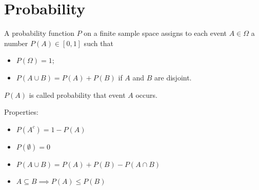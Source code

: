 \section{Probability}
{
    A probability function $P$ on a finite sample space assigns to each event $A \in \Omega$ a number $P(A) \in [0,1]$ such that
    \begin{itemize}
        \item $P(\Omega) = 1$;
        \item $P(A \cup B) = P(A) + P(B)$ if $A$ and $B$ are disjoint.
    \end{itemize}
    $P(A)$ is called probability that event $A$ occurs.
}
Properties:
\begin{itemize}[itemsep=1pt]
    \item $P(A^c) = 1 - P(A)$
    \item $P(\emptyset) = 0$
    \item $P(A \cup B) = P(A) + P(B) - P(A \cap B)$
    \item $A \subseteq B \implies P(A) \leq P(B)$
\end{itemize}

